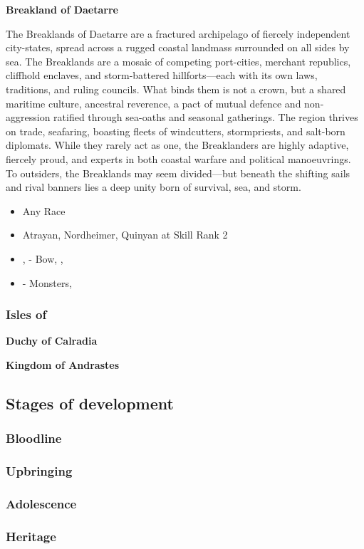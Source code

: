 \documentclass[12pt]{article}
\newcommand{\subsubsubsection}[1]{%
  \vspace{1em} %
  \noindent\textbf{\small #1}\par
  \vspace{0.5em} %
}
\begin{document}
\subsubsubsection{Breakland of Daetarre}
The Breaklands of Daetarre are a fractured archipelago of fiercely independent city-states, spread across a rugged coastal landmass surrounded on all sides by sea. The Breaklands are a mosaic of competing port-cities, merchant republics, cliffhold enclaves, and storm-battered hillforts—each with its own laws, traditions, and ruling councils. What binds them is not a crown, but a shared maritime culture, ancestral reverence, a pact of mutual defence and non-aggression ratified through sea-oaths and seasonal gatherings. The region thrives on trade, seafaring, boasting fleets of windcutters, stormpriests, and salt-born diplomats. While they rarely act as one, the Breaklanders are highly adaptive, fiercely proud, and experts in both coastal warfare and political manoeuvrings. To outsiders, the Breaklands may seem divided—but beneath the shifting sails and rival banners lies a deep unity born of survival, sea, and storm.
\begin{itemize}
\item Any Race
\item Atrayan, Nordheimer, Quinyan at Skill Rank 2
\item {},  - Bow, , 
\item {} - Monsters, 
\end{itemize}
\newpage
\subsubsection{Isles of }
\subsubsubsection{Duchy of Calradia}
\subsubsubsection{Kingdom of Andrastes}
\newpage
\subsection{Stages of development}
\subsubsection{Bloodline}
\subsubsection{Upbringing}
\subsubsection{Adolescence}
\subsubsection{Heritage}
\end{document}

